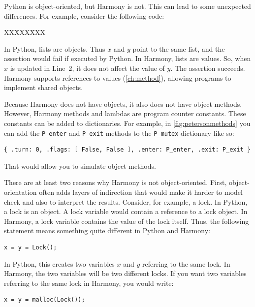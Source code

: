\documentclass{report}
\newcommand{\harmonysource}[1]{
\begin{tabbing}
XX\=XXX\=XXX\kill
    
\end{tabbing}
}
\newenvironment{code}{
\tcolorbox
}{
\endtcolorbox
}
\begin{document}
Python is object-oriented, but Harmony is not.  This can lead to some
unexpected differences.  For example, consider the following code:

\begin{code}
\harmonysource{oo}
\end{code}

In Python, lists are objects.  Thus $x$ and $y$ point to the same list,
and the assertion would fail if executed by Python.
In Harmony, lists are values.  So, when $x$ is updated in Line~2, it does
not affect the value of $y$.  The assertion succeeds.
Harmony supports references to values (\autoref{ch:method}),
allowing programs to implement shared objects.

Because Harmony does not have objects, it also does not have object methods.
However, Harmony methods and lambdas are program counter constants.
These constants can be added to dictionaries.
For example, in \autoref{fig:petersonmethods}
you can add the \texttt{P\_enter} and
\texttt{P\_exit} methods to the \texttt{P\_mutex} dictionary
like so:
\begin{code}
\begin{verbatim}
{ .turn: 0, .flags: [ False, False ], .enter: P_enter, .exit: P_exit }
\end{verbatim}
\end{code}
That would allow you to simulate object methods.

There are at least two reasons why Harmony is not object-oriented.
First,
object-orientation often adds layers of indirection that would make it
harder to model check and also to interpret the results.  Consider, for example,
a lock.  In Python, a lock is an object.  A lock variable would contain a
reference to a lock object.  In Harmony, a lock variable contains the value
of the lock itself.
Thus, the following statement means something quite different in Python and
Harmony:

\begin{code}
\begin{verbatim}
x = y = Lock();
\end{verbatim}
\end{code}

In Python, this creates two variables $x$ and $y$ referring to the same lock.
In Harmony, the two variables will be two different locks.  If you want two
variables referring to the same lock in Harmony, you would write:

\begin{code}
\begin{verbatim}
x = y = malloc(Lock());
\end{verbatim}
\end{code}
\end{document}
